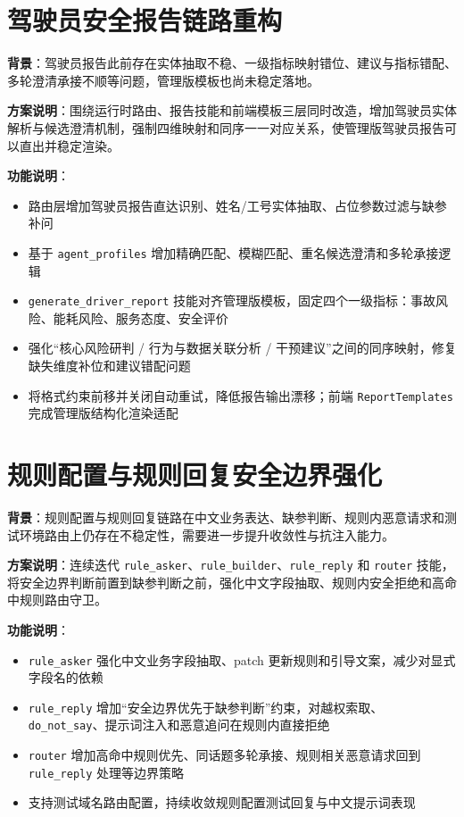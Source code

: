 \documentclass[UTF8]{ctexart}
\begin{document}
\section{驾驶员安全报告链路重构}

\textbf{背景}：驾驶员报告此前存在实体抽取不稳、一级指标映射错位、建议与指标错配、多轮澄清承接不顺等问题，管理版模板也尚未稳定落地。

\textbf{方案说明}：围绕运行时路由、报告技能和前端模板三层同时改造，增加驾驶员实体解析与候选澄清机制，强制四维映射和同序一一对应关系，使管理版驾驶员报告可以直出并稳定渲染。

\textbf{功能说明}：
\begin{itemize}
\item 路由层增加驾驶员报告直达识别、姓名/工号实体抽取、占位参数过滤与缺参补问
\item 基于 \texttt{agent\_profiles} 增加精确匹配、模糊匹配、重名候选澄清和多轮承接逻辑
\item \texttt{generate\_driver\_report} 技能对齐管理版模板，固定四个一级指标：事故风险、能耗风险、服务态度、安全评价
\item 强化“核心风险研判 / 行为与数据关联分析 / 干预建议”之间的同序映射，修复缺失维度补位和建议错配问题
\item 将格式约束前移并关闭自动重试，降低报告输出漂移；前端 \texttt{ReportTemplates} 完成管理版结构化渲染适配
\end{itemize}

\section{规则配置与规则回复安全边界强化}

\textbf{背景}：规则配置与规则回复链路在中文业务表达、缺参判断、规则内恶意请求和测试环境路由上仍存在不稳定性，需要进一步提升收敛性与抗注入能力。

\textbf{方案说明}：连续迭代 \texttt{rule\_asker}、\texttt{rule\_builder}、\texttt{rule\_reply} 和 \texttt{router} 技能，将安全边界判断前置到缺参判断之前，强化中文字段抽取、规则内安全拒绝和高命中规则路由守卫。

\textbf{功能说明}：
\begin{itemize}
\item \texttt{rule\_asker} 强化中文业务字段抽取、patch 更新规则和引导文案，减少对显式字段名的依赖
\item \texttt{rule\_reply} 增加“安全边界优先于缺参判断”约束，对越权索取、\texttt{do\_not\_say}、提示词注入和恶意追问在规则内直接拒绝
\item \texttt{router} 增加高命中规则优先、同话题多轮承接、规则相关恶意请求回到 \texttt{rule\_reply} 处理等边界策略
\item 支持测试域名路由配置，持续收敛规则配置测试回复与中文提示词表现
\end{itemize}
\end{document}

